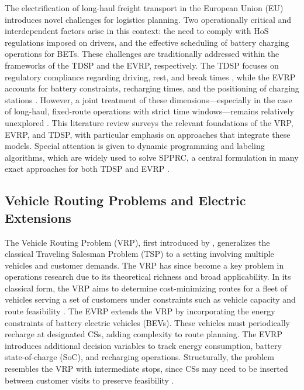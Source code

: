 \documentclass[trsc,dblanonrev]{informs4}
\begin{document}
The electrification of long-haul freight transport in the European Union (EU) introduces novel challenges for logistics planning. Two operationally critical and interdependent factors arise in this context: the need to comply with HoS regulations imposed on drivers, and the effective scheduling of battery charging operations for BETs. These challenges are traditionally addressed within the frameworks of the TDSP and the EVRP, respectively. The TDSP focuses on regulatory compliance regarding driving, rest, and break times \citep{goel2010truck, goel2017exact}, while the EVRP accounts for battery constraints, recharging times, and the positioning of charging stations \citep{desaulniers2016exact, schneider2014electric}. However, a joint treatment of these dimensions—especially in the case of long-haul, fixed-route operations with strict time windows—remains relatively unexplored \citep{schiffer2017impact, schneider2023novel}. This literature review surveys the relevant foundations of the VRP, EVRP, and TDSP, with particular emphasis on approaches that integrate these models. Special attention is given to dynamic programming and labeling algorithms, which are widely used to solve SPPRC, a central formulation in many exact approaches for both TDSP and EVRP \citep{vidal2020concise}.

\subsection{Vehicle Routing Problems and Electric Extensions}

The Vehicle Routing Problem (VRP), first introduced by \citet{dantzig1959truck}, generalizes the classical Traveling Salesman Problem (TSP) to a setting involving multiple vehicles and customer demands. The VRP has since become a key problem in operations research due to its theoretical richness and broad applicability. In its classical form, the VRP aims to determine cost-minimizing routes for a fleet of vehicles serving a set of customers under constraints such as vehicle capacity and route feasibility \citep{jiang2025multi}. The EVRP extends the VRP by incorporating the energy constraints of battery electric vehicles (BEVs). These vehicles must periodically recharge at designated CSs, adding complexity to route planning. The EVRP introduces additional decision variables to track energy consumption, battery state-of-charge (SoC), and recharging operations. Structurally, the problem resembles the VRP with intermediate stops, since CSs may need to be inserted between customer visits to preserve feasibility \citep{schneider2014electric}.
\end{document}
